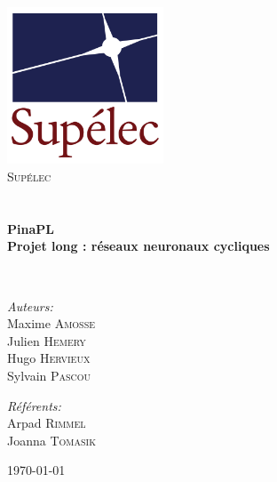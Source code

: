 
\begin{titlepage}
\begin{center}

\includegraphics[width=0.35\textwidth]{./images/logo.png}~\\[1cm]

\textsc{\LARGE Supélec}\\[1.5cm]

\textsc{\Large }\\[0.5cm]

\HRule
\\[0.4cm]

{\huge \bfseries PinaPL\\
Projet long : réseaux neuronaux cycliques \\[0.4cm] }

\HRule
\\[1.5cm]

\begin{minipage}{0.4\textwidth}
\begin{flushleft} \large
\emph{Auteurs:}\\
Maxime \textsc{Amosse}\\
Julien \textsc{Hemery}\\
Hugo \textsc{Hervieux}\\
Sylvain \textsc{Pascou}
\end{flushleft}
\end{minipage}
\begin{minipage}{0.4\textwidth}
\begin{flushright} \large
\emph{Référents:} \\
Arpad \textsc{Rimmel} \\
Joanna \textsc{Tomasik}
\end{flushright}
\end{minipage}

\vfill

{\large \today}

\end{center}
\end{titlepage}
